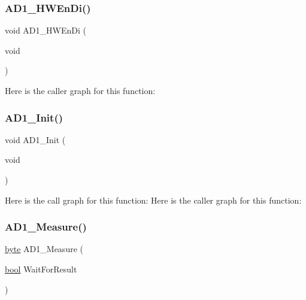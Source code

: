 \subsubsection{\texorpdfstring{A\+D1\+\_\+\+H\+W\+En\+Di()}{AD1\_HWEnDi()}}
{\footnotesize\ttfamily void A\+D1\+\_\+\+H\+W\+En\+Di (\begin{DoxyParamCaption}\item[{void}]{ }\end{DoxyParamCaption})}

Here is the caller graph for this function\+:
\mbox{\label{group___a_d1__module_ga018b22b1bc9627ef871cf94bb3e3bbe1}} 
\subsubsection{\texorpdfstring{A\+D1\+\_\+\+Init()}{AD1\_Init()}}
{\footnotesize\ttfamily void A\+D1\+\_\+\+Init (\begin{DoxyParamCaption}\item[{void}]{ }\end{DoxyParamCaption})}

Here is the call graph for this function\+:
Here is the caller graph for this function\+:
\mbox{\label{group___a_d1__module_ga84c2908baf7bf49c540b20b5b8d14da6}} 
\subsubsection{\texorpdfstring{A\+D1\+\_\+\+Measure()}{AD1\_Measure()}}
{\footnotesize\ttfamily \hyperlink{group___p_e___types__module_ga0c8186d9b9b7880309c27230bbb5e69d}{byte} A\+D1\+\_\+\+Measure (\begin{DoxyParamCaption}\item[{\hyperlink{group___p_e___types__module_ga97a80ca1602ebf2303258971a2c938e2}{bool}}]{Wait\+For\+Result }\end{DoxyParamCaption})}



